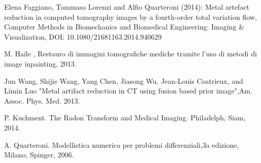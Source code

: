 \begin{thebibliography}{50}
 Elena Faggiano, Tommaso Lorenzi and Alfio Quarteroni (2014): Metal artefact reduction in computed
tomography images by a fourth-order total variation flow, Computer Methods in Biomechanics and Biomedical Engineering:
Imaging \& Visualization, DOI: 10.1080/21681163.2014.940629

 M. Haile , Restauro di immagini tomografiche mediche tramite l'uso di metodi di image inpainting, 2013. 

 Jun Wang, Shijie Wang, Yang Chen, Jiasong Wu, Jean-Louis Coatrieux, and Limin Luo "Metal artifact reduction in CT using fusion based prior image",Am. Assoc. Phys. Med. 2013.

 P. Kuchment. The Radon Transform and Medical Imaging. Philadelph, Siam, 2014.

 A. Quarteroni. Modellistica numerica per problemi differenziali,3a edizione, Milano, Spinger, 2006. 

\end{thebibliography}